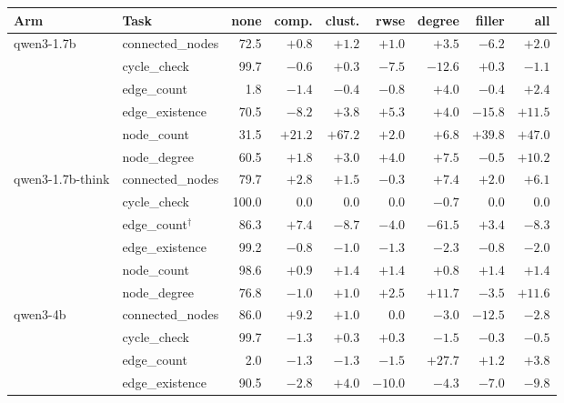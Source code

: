 \documentclass[11pt]{article}
\begin{document}
\begin{table}[t]
\centering
\footnotesize
\setlength{\tabcolsep}{4.2pt}
\renewcommand{\arraystretch}{0.94}
\begin{tabular}{llrrrrrrr}
\toprule
Arm & Task & none & comp. & clust. & rwse & degree & filler & all \\
\midrule
\multirow{6}{*}{qwen3-1.7b}
 & connected\_nodes & 72.5 & $+0.8$ & $+1.2$ & $+1.0$ & $+3.5$ & $\mathbf{-6.2}$ & $+2.0$ \\
 & cycle\_check     & 99.7 & $-0.6$ & $+0.3$ & $\mathbf{-7.5}$ & $\mathbf{-12.6}$ & $+0.3$ & $-1.1$ \\
 & edge\_count      &  1.8 & $-1.4$ & $-0.4$ & $-0.8$ & $+4.0$ & $-0.4$ & $+2.4$ \\
 & edge\_existence  & 70.5 & $\mathbf{-8.2}$ & $+3.8$ & $+5.3$ & $+4.0$ & $\mathbf{-15.8}$ & $\mathbf{+11.5}$ \\
 & node\_count      & 31.5 & $\mathbf{+21.2}$ & $\mathbf{+67.2}$ & $+2.0$ & $\mathbf{+6.8}$ & $\mathbf{+39.8}$ & $\mathbf{+47.0}$ \\
 & node\_degree     & 60.5 & $+1.8$ & $+3.0$ & $+4.0$ & $\mathbf{+7.5}$ & $-0.5$ & $\mathbf{+10.2}$ \\
\midrule
\multirow{6}{*}{qwen3-1.7b-think}
 & connected\_nodes & 79.7 & $+2.8$ & $+1.5$ & $-0.3$ & $\mathbf{+7.4}$ & $+2.0$ & $\mathbf{+6.1}$ \\
 & cycle\_check     & 100.0 & $0.0$ & $0.0$ & $0.0$ & $-0.7$ & $0.0$ & $0.0$ \\
 & edge\_count$^{\dagger}$ & 86.3 & $+7.4$ & $-8.7$ & $-4.0$ & $\mathbf{-61.5}$ & $+3.4$ & $-8.3$ \\
 & edge\_existence  & 99.2 & $-0.8$ & $-1.0$ & $-1.3$ & $-2.3$ & $-0.8$ & $-2.0$ \\
 & node\_count      & 98.6 & $+0.9$ & $+1.4$ & $+1.4$ & $+0.8$ & $+1.4$ & $+1.4$ \\
 & node\_degree     & 76.8 & $-1.0$ & $+1.0$ & $+2.5$ & $\mathbf{+11.7}$ & $-3.5$ & $\mathbf{+11.6}$ \\
\midrule
\multirow{6}{*}{qwen3-4b}
 & connected\_nodes & 86.0 & $\mathbf{+9.2}$ & $+1.0$ & $0.0$ & $-3.0$ & $\mathbf{-12.5}$ & $-2.8$ \\
 & cycle\_check     & 99.7 & $-1.3$ & $+0.3$ & $+0.3$ & $-1.5$ & $-0.3$ & $-0.5$ \\
 & edge\_count      &  2.0 & $-1.3$ & $-1.3$ & $-1.5$ & $\mathbf{+27.7}$ & $+1.2$ & $\mathbf{+3.8}$ \\
 & edge\_existence  & 90.5 & $-2.8$ & $\mathbf{+4.0}$ & $\mathbf{-10.0}$ & $\mathbf{-4.3}$ & $\mathbf{-7.0}$ & $\mathbf{-9.8}$ \\

\end{tabular}
\end{table}
\end{document}
